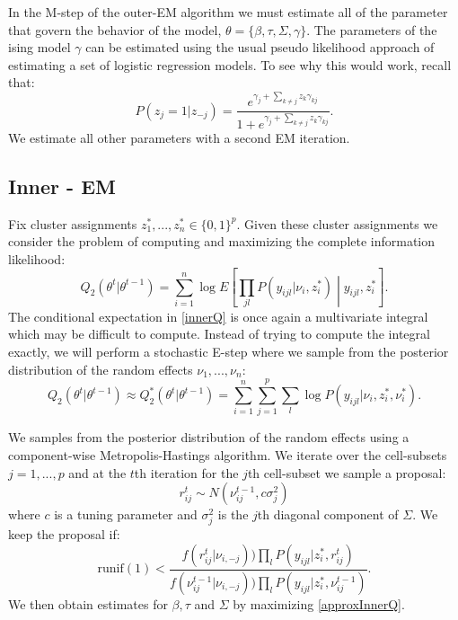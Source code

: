 \documentclass{article}\usepackage[]{graphicx}\usepackage[]{color}
\begin{document}
In the M-step of the outer-EM algorithm we must estimate all of the parameter that govern the behavior of the model, $\theta = \{\beta, \tau, \Sigma, \gamma\}$. The parameters of the ising model $\gamma$ can be estimated using the usual pseudo likelihood approach of estimating a set of logistic regression models. To see why this would work, recall that:
$$
P(z_{j} = 1| z_{-j}) = \frac{e^{\gamma_{j} + \sum_{k\neq j} z_{k} \gamma_{kj}}}{1 + e^{\gamma_{j} + \sum_{k\neq j} z_{k} \gamma_{kj}}}.
$$
We estimate all other parameters with a second EM iteration.







\subsection{Inner - EM} 
Fix cluster assignments $z_{1}^*,...,z_{n}^* \in \{0,1\}^{p}$. Given these cluster assignments we consider the problem of computing and maximizing the complete information likelihood:
\begin{equation}\label{innerQ}
Q_2(\theta^t|\theta^{t-1}) = 
\sum_{i=1}^{n} \log E\left[ \prod_{jl} P(y_{ijl}| \nu_i, z_i^*) \middle| y_{ijl}, z_i^* \right].
\end{equation}
The conditional expectation in \eqref{innerQ} is once again a multivariate integral which may be difficult to compute. Instead of trying to compute the integral exactly, we will perform a stochastic E-step where we sample from the posterior distribution of the random effects $\nu_1,...,\nu_n$:
\begin{equation}\label{approxInnerQ}
Q_2(\theta^t|\theta^{t-1}) \approx Q_2^*(\theta^t|\theta^{t-1}) = 
\sum_{i=1}^{n} \sum_{j=1}^{p} \sum_{l} \log P(y_{ijl}| \nu_i, z_i^*, \nu_{i}^*).
\end{equation}

We samples from the posterior distribution of the random effects using a component-wise Metropolis-Hastings algorithm.  We iterate over the cell-subsets $j = 1,...,p$ and at the $t$th iteration for the $j$th cell-subset we sample a proposal:
$$
r_{ij}^{t} \sim N(\nu_{ij}^{t-1}, c\sigma^{2}_j)
$$
where $c$ is a tuning parameter and $\sigma_j^2$ is the $j$th diagonal component of $\Sigma$. We keep the proposal if:
$$
\text{runif}(1) < 
\frac{f(r_{ij}^t | \nu_{i, -j}))\prod_{l} P(y_{ijl} | z_i^*, r_{ij}^{t})}
{f(\nu_{ij}^{t-1} | \nu_{i, -j}))\prod_{l} P(y_{ijl} | z_i^*, \nu_{ij}^{t-1})}.
$$
We then obtain estimates for $\beta, \tau$ and $\Sigma$ by maximizing \eqref{approxInnerQ}.
\end{document}

